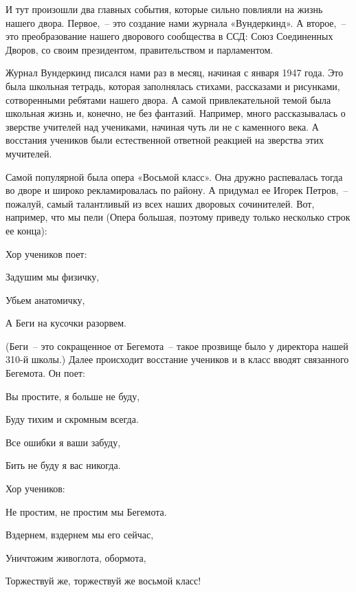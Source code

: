 И тут произошли два главных события, которые сильно повлияли на жизнь нашего двора. Первое,~-- это создание нами журнала «Вундеркинд». А второе,~-- это преобразование нашего дворового сообщества в ССД: Союз Соединенных Дворов, со своим президентом, правительством и парламентом.

Журнал Вундеркинд писался нами раз в месяц, начиная с января 1947 года. Это была школьная тетрадь, которая заполнялась стихами, рассказами и рисунками, сотворенными ребятами нашего двора. А самой привлекательной темой была школьная жизнь и, конечно, не без фантазий. Например, много рассказывалась о зверстве учителей над учениками, начиная чуть ли не с каменного века. А восстания учеников были естественной ответной реакцией на зверства этих мучителей.

Самой популярной была опера «Восьмой класс». Она дружно распевалась тогда во дворе и широко рекламировалась по району. А придумал ее Игорек Петров,~-- пожалуй, самый талантливый из всех наших дворовых сочинителей. Вот, например, что мы пели (Опера большая, поэтому приведу только несколько строк ее конца): 

Хор учеников поет:

\indent

{\itshape

Задушим мы физичку,

Убьем анатомичку,

А Беги на кусочки разорвем.

}

\indent

(Беги~-- это сокращенное от Бегемота~-- такое прозвище было у директора нашей 310-й школы.) Далее происходит восстание учеников и в класс вводят связанного Бегемота. Он поет:

\indent

{\itshape

Вы простите, я больше не буду, 

Буду тихим и скромным всегда. 

Все ошибки я ваши забуду, 

Бить не буду я вас никогда.

}

\indent

\noindent
Хор учеников:

\indent

{\itshape

Не простим, не простим мы Бегемота. 

Вздернем, вздернем мы его сейчас,
 
Уничтожим живоглота, обормота, 

Торжествуй же, торжествуй же восьмой класс!

}

